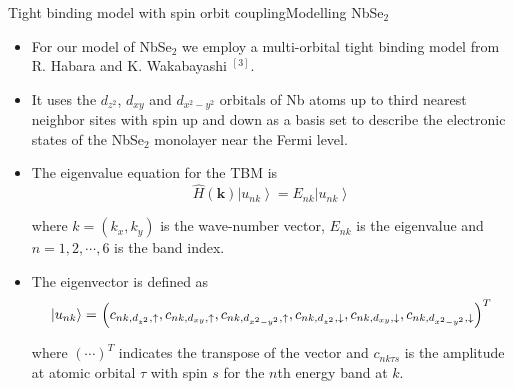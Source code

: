 \documentclass[9pt]{beamer}
\begin{document}
\begin{frame}{Tight binding model with spin orbit coupling}{Modelling NbSe$_2$}
  \begin{itemize}
    \item For our model of NbSe$_2$ we employ a multi-orbital tight binding model from R. Habara and K. Wakabayashi $^{[3]}$.

    \item It uses the $d_{z^2}$, $d_{xy}$ and $d_{x^2-y^2}$ orbitals of Nb atoms up to third nearest neighbor sites with spin up and down as a basis set to describe the electronic states of the NbSe$_2$ monolayer near the Fermi level.

    \item{The eigenvalue equation for the TBM is
      \begin{equation}
        \label{TBM_evalue_eqn}
        \hat{H}(\boldsymbol{k})\left|u_{n k}\right\rangle=E_{n k}\left|u_{n k}\right\rangle
      \end{equation}

      where $k=\left(k_{x}, k_{y}\right)$ is the wave-number vector, $E_{nk}$ is the eigenvalue and $n = 1,2,\cdots,6$ is the band index.
      }

    \item{The eigenvector is defined as
      \begin{equation}
        \left|u_{n k}\right\rangle=$ $\left(c_{n k, d_{z^{2}}, \uparrow}, c_{n k, d_{x y}, \uparrow}, c_{n k, d_{x^{2}-y^{2}}, \uparrow}, c_{n k, d_{z^{2}}, \downarrow}, c_{n k, d_{x y}, \downarrow}, c_{n k, d_{x^{2}-y^{2}}, \downarrow}\right)^{T}
      \end{equation}

      where $(\cdots)^T$ indicates the transpose of the vector and $c_{nk\tau s}$ is the amplitude at atomic orbital $\tau$ with spin $s$ for the $n$th energy band at $k$.
      }
  \end{itemize}
\end{frame}
\end{document}
